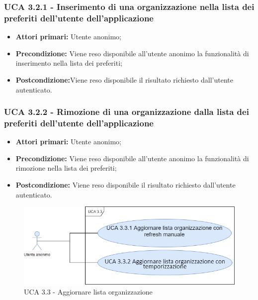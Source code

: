 \subsubsection{UCA 3.2.1 - Inserimento di una organizzazione nella lista dei preferiti dell’utente dell’applicazione}%
\begin{itemize}
	\item \textbf{Attori primari:} Utente anonimo;
	\item \textbf{Precondizione:} Viene reso disponibile all’utente anonimo la funzionalità di inserimento nella lista dei preferiti; 
	\item \textbf{Postcondizione:}Viene reso disponibile il risultato richiesto dall’utente autenticato.
\end{itemize}

\subsubsection{UCA 3.2.2 - Rimozione di una organizzazione dalla lista dei preferiti dell’utente dell’applicazione}%
\begin{itemize}
	\item \textbf{Attori primari:} Utente anonimo;
	\item \textbf{Precondizione:} Viene reso disponibile all’utente anonimo la funzionalità di rimozione nella lista dei preferiti;
	\item \textbf{Postcondizione:} Viene reso disponibile il risultato richiesto dall’utente autenticato.
\end{itemize}

\begin{figure}[h]
	\centering
	\caption{UCA 3.3 - Aggiornare lista organizzazione}
	\includegraphics[scale=0.5]{sezioni/UseCase/Immagini/UCA3.3.png}
\end{figure}

